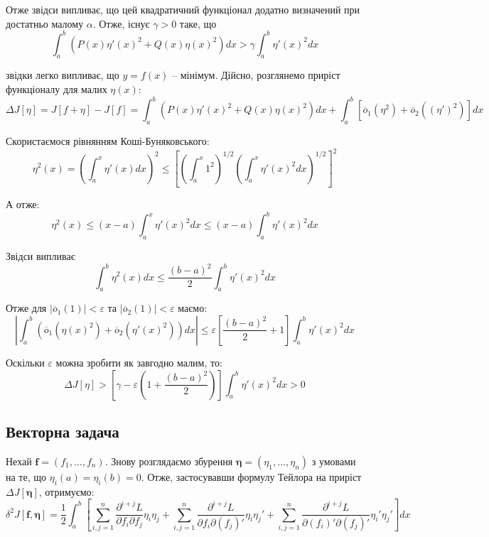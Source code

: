 \documentclass[14pt]{extarticle}
\newcommand{\<}{\langle}
\renewcommand{\>}{\rangle}
\theoremstyle{mystyle}{\newtheorem{definition}{Definition}[section]}
\theoremstyle{mystyle}{\newtheorem{proposition}[definition]{Proposition}}
\theoremstyle{mystyle}{\newtheorem{theorem}[definition]{Theorem}}
\theoremstyle{mystyle}{\newtheorem{lemma}[definition]{Lemma}}
\theoremstyle{mystyle}{\newtheorem{corollary}[definition]{Corollary}}
\theoremstyle{mystyle}{\newtheorem*{remark}{Remark}}
\theoremstyle{mystyle}{\newtheorem*{remarks}{Remarks}}
\theoremstyle{mystyle}{\newtheorem*{example}{Example}}
\theoremstyle{mystyle}{\newtheorem*{examples}{Examples}}
\theoremstyle{definition}{\newtheorem*{exercise}{Exercise}}
\theoremstyle{cstyle}{\newtheorem*{cthm}{}}
\theoremstyle{warn}
\begin{document}
Отже звідси випливає, що цей квадратичний функціонал додатно визначений при достатньо малому $\alpha$. Отже, існує $\gamma > 0$ таке, що
\begin{equation}
    \int_a^b (P(x)\eta'(x)^2 + Q(x)\eta(x)^2)dx > \gamma\int_a^b \eta'(x)^2dx
\end{equation}

звідки легко випливає, що $y=f(x)$ -- мінімум. Дійсно, розглянемо приріст функціоналу 
для малих $\eta(x)$:
\begin{equation}
    \Delta J[\eta] = J[f+\eta]-J[f] = \int_a^b (P(x)\eta'(x)^2 + Q(x)\eta(x)^2)dx + \int_a^b [\overline{o}_1(\eta^2) + \overline{o}_2((\eta')^2)]dx
\end{equation}

Скористаємося рівнянням Коші-Буняковського:
\begin{equation}
    \eta^2(x) = \left(\int_a^x \eta'(x)dx\right)^2 \leq \left[\left(\int_a^x 1^2\right)^{1/2}\left(\int_a^x \eta'(x)^2dx\right)^{1/2}\right]^2
\end{equation}

А отже:
\begin{equation}
    \eta^2(x) \leq (x-a)\int_a^x \eta'(x)^2dx \leq (x-a)\int_a^b \eta'(x)^2dx
\end{equation}

Звідси випливає
\begin{equation}
    \int_a^b \eta^2(x)dx \leq \frac{(b-a)^2}{2}\int_a^b \eta'(x)^2dx
\end{equation}

Отже для $|\overline{o}_1(1)|<\varepsilon$ та $|\overline{o}_2(1)|<\varepsilon$ маємо:
\begin{equation}
    \left|\int_a^b (\overline{o}_1(\eta(x)^2)+\overline{o}_2(\eta'(x)^2))dx \right| \leq \varepsilon\left[\frac{(b-a)^2}{2}+1\right]\int_a^b \eta'(x)^2dx
\end{equation}

Оскільки $\varepsilon$ можна зробити як завгодно малим, то:
\begin{equation}
    \Delta J[\eta] > \left[\gamma - \varepsilon\left(1+\frac{(b-a)^2}{2}\right)\right]\int_a^b \eta'(x)^2dx > 0
\end{equation}

\subsection{Векторна задача}

Нехай $\mathbf{f}=(f_1,\dots,f_n)$. Знову розглядаємо збурення $\boldsymbol{\eta}=(\eta_1,\dots,\eta_n)$ з умовами на те, що
$\eta_i(a)=\eta_i(b)=0$. Отже, застосувавши формулу Тейлора на приріст $\Delta J[\boldsymbol{\eta}]$, отримуємо:
\begin{equation}
    \delta^2 J[\mathbf{f},\boldsymbol{\eta}] = \frac{1}{2}\int_a^b\left[\sum_{i,j=1}^n \frac{\partial^{i+j} L}{\partial f_i\partial f_j}\eta_i\eta_j + \sum_{i,j=1}^n \frac{\partial^{i+j} L}{\partial f_i \partial (f_j)'}\eta_i\eta_j' + \sum_{i,j=1}^n \frac{\partial^{i+j} L}{\partial (f_i)'\partial (f_j)'}\eta_i'\eta_j'\right]dx
\end{equation}
\end{document}
